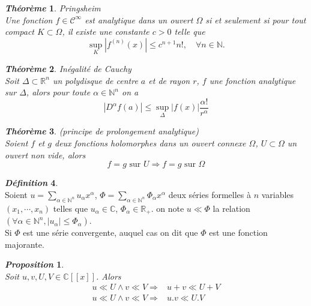 \documentclass[12pt,a4paper]{report}
\theoremstyle{plain}
\newtheorem{theo}{\textit{Théorème}}[chapter]
\newtheorem{pro}{\textit{Proposition}}[chapter]
\theoremstyle{definition}
\newtheorem{defn}[theo]{\textit{Définition}}
\theoremstyle{remark}
\newcommand{\C}{\ensuremath{\mathbb{C}}}
\newcommand{\Cfx}{\ensuremath{\mathbb{C} [[x]] }}
\newcommand{\Nn}{\ensuremath{\mathbb{N}^n}}
\newcommand{\Mn}{\ensuremath{\mathbb{R}^n}}
\newcommand{\Mp}{\ensuremath{{\mathbb{R}}_+}}
\newcommand{\xn}{\ensuremath{(x_1,\cdots ,x_n)}}
\begin{document}
\begin{theo}\cite{pring}{Pringsheim} \\
Une fonction $ f \in \mathcal{C}^\infty $      est  analytique dans un ouvert $\Omega$ si et seulement si  
pour tout compact $K   \subset \Omega$, il existe une constante $c>0$ telle que 
$$\sup_K|f^{(n)}(x)| \leq c^{n+1}n!, \quad \forall n \in \mathbb{N}.$$
\end{theo}













\begin{theo}\cite{holomorphe}{Inégalité de Cauchy}\label{ingcauchy}\\
Soit $\Delta \subset \Mn$ un polydisque de centre $a$ et de rayon $r$, $f$ une fonction analytique sur $\Delta$, alors pour toute $\alpha \in  \Nn$ on a 
$$|D^\alpha f(a)| \leq  \sup_\Delta |f(x)| \frac{\alpha!}{r^\alpha}$$
\end{theo}

\begin{theo}\cite{holomorphe}(principe de prolongement analytique)\label{prolo} \\
Soient $f$ et $g$ deux fonctions holomorphes dans un ouvert connexe $\Omega$, $U\subset \Omega$ un ouvert non vide, alors 
$$ f=g \text{ sur } U \Rightarrow f=g  \text{ sur }  \Omega $$

\end{theo}

\begin{defn}\cite{wag0} \\
Soient $u=\sum_{\alpha \in \Nn} u_\alpha x^\alpha $, $\Phi= \sum_{\alpha \in \Nn} \Phi_\alpha x^\alpha $ deux séries formelles à $n$ variables $ \xn $ telles que $u_\alpha \in \C$, $\Phi_\alpha \in \Mp$. on note $ u \ll \Phi$ la relation $ ( \forall \alpha \in \Nn, |u_\alpha| \leq \Phi_\alpha)$.
\\ Si $\Phi$ est une série convergente, auquel cas on dit que $\Phi$ est une fonction majorante.
\end{defn}

\begin{pro}\cite{van}\label{van}\\
Soit $ u,v, U, V \in \Cfx$. Alors
\begin{eqnarray}
 u \ll U \wedge v \ll V   \Rightarrow & u+v \ll U+V \\
 u \ll U \wedge v \ll V   \Rightarrow & u.v \ll U.V  \label{majp}
\end{eqnarray}
\end{pro}
\end{document}
